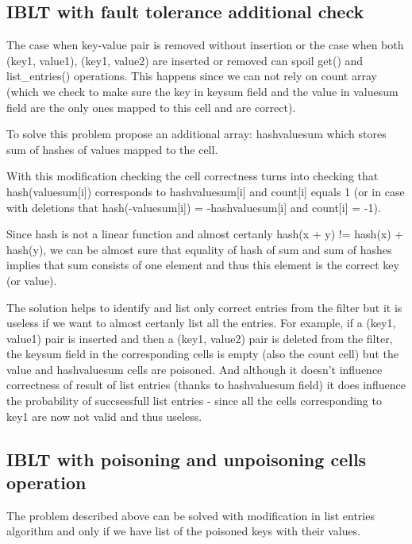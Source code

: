 \documentclass{article}
\begin{document}
\subsection{IBLT with fault tolerance additional check}

The case when key-value pair is removed without insertion or the case when 
both (key1, value1), (key1, value2) are inserted or removed can spoil get() and 
list\_entries() operations. This happens since we can not rely on count array 
(which we check to make sure the key in keysum field and the value in valuesum 
field are the only ones mapped to this cell and are correct).

To solve this problem \textcite{GoMi2011} propose an additional array: 
hashvaluesum which stores sum of hashes of values mapped to the cell.

With this modification checking the cell correctness turns into checking 
that hash(valuesum[i]) corresponds to hashvaluesum[i] and count[i] equals 1 (or
in case with deletions that hash(-valuesum[i]) = -hashvaluesum[i] and count[i] =
-1).

Since hash is not a linear function and almost certanly hash(x + y) != hash(x)
+ hash(y), we can be almost sure that equality of hash of sum and sum of hashes implies 
that sum consists of one element and thus this element is the correct key (or value).

The solution helps to identify and list only correct entries from the filter 
but it is useless if we want to almost certanly list all the entries. For example,
if a (key1, value1) pair is inserted and then a (key1, value2) pair is deleted 
from the filter, the keysum field in the corresponding cells is empty (also the 
count cell) but the value and hashvaluesum cells are poisoned. And although it
doesn't influence correctness of result of list entries (thanks to hashvaluesum
field) it does influence the probability of succsessfull list entries - since 
all the cells corresponding to key1 are now not valid and thus useless.

\subsection{IBLT with poisoning and unpoisoning cells operation}

The problem described above can be solved with modification in list entries 
algorithm and only if we have list of the poisoned keys with their values. 
\end{document}
